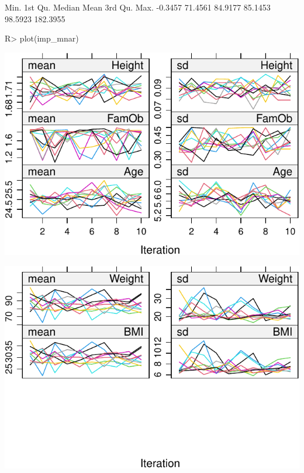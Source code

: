 \documentclass[
]{jss}
\begin{document}
\begin{CodeChunk}
\begin{CodeOutput}
    Min.  1st Qu.   Median     Mean  3rd Qu.     Max. 
 -0.3457  71.4561  84.9177  85.1453  98.5923 182.3955 
\end{CodeOutput}
\begin{CodeInput}
R> plot(imp_mnar)
\end{CodeInput}


\begin{center}\includegraphics{Imputation_of_Incomplete_Multilevel_Data_files/figure-latex/obsmnar_plot-1} \end{center}



\begin{center}\includegraphics{Imputation_of_Incomplete_Multilevel_Data_files/figure-latex/obsmnar_plot-2} \end{center}

\end{CodeChunk}
\end{document}
